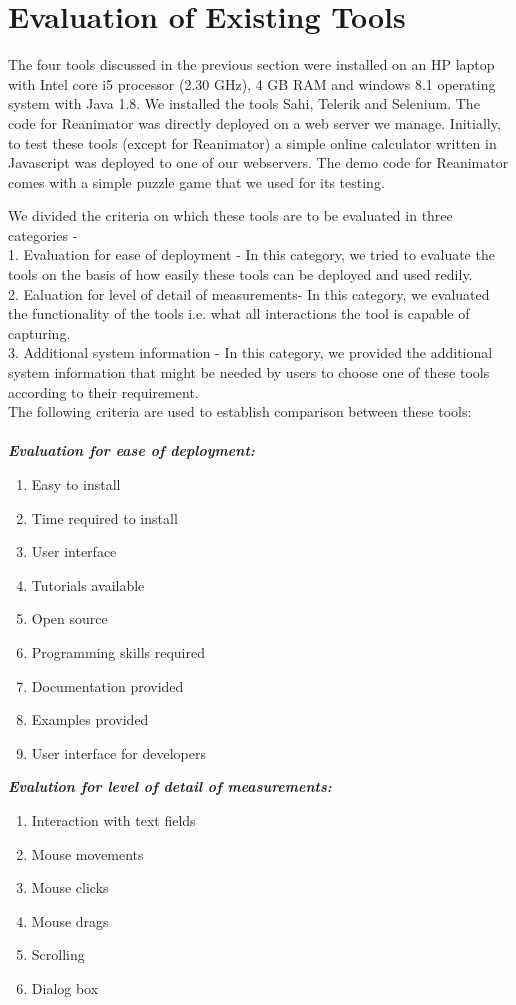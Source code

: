 \documentclass[12pt,journal]{IEEEtran}
\begin{document}
\section{Evaluation of Existing Tools}
The four tools discussed in the previous section were installed on an HP laptop with Intel core i5 processor (2.30 GHz), 4 GB RAM and windows 8.1 operating system with Java 1.8. We installed the tools Sahi, Telerik and Selenium. The code for Reanimator was directly deployed on a web server we manage. Initially, to test these tools (except for Reanimator) a simple online calculator written in Javascript was deployed to one of our webservers. The demo code for Reanimator comes with a simple puzzle game that we used for its testing.
\par
We divided the criteria on which these tools are to be evaluated in three categories - \\
1. Evaluation for ease of deployment - In this category, we tried to evaluate the tools on the basis of how easily these tools can be deployed and used redily.\\
2. Ealuation for level of detail of measurements- In this category, we evaluated the functionality of the tools i.e. what all interactions the tool is capable of capturing.\\
3. Additional system information - In this category, we provided the additional system information that might be needed by users to choose one of these tools according to their requirement.\\
The following criteria are used to establish comparison between these tools:\\ \\
\textbf{ \textit{Evaluation for ease of deployment:}}
\begin{enumerate}
\item Easy to install
\item Time required to install
\item User interface
\item Tutorials available
\item Open source
\item Programming skills required
\item Documentation provided
\item Examples provided
\item User interface for developers\\
\end{enumerate}
\textbf{\textit{Evalution for level of detail of measurements:}}
\begin{enumerate}
\item Interaction with text fields
\item Mouse movements
\item Mouse clicks
\item Mouse drags
\item Scrolling
\item Dialog box\\
\end{enumerate}
\end{document}
